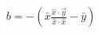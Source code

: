 \documentclass[preview]{standalone}
\begin{document}
\begin{align*}
b = -( \bar{x} \frac{\hat{x}\cdot\overrightarrow{y}}{\hat{x}\cdot\hat{x}} - \bar{y} )
\end{align*}
\end{document}
